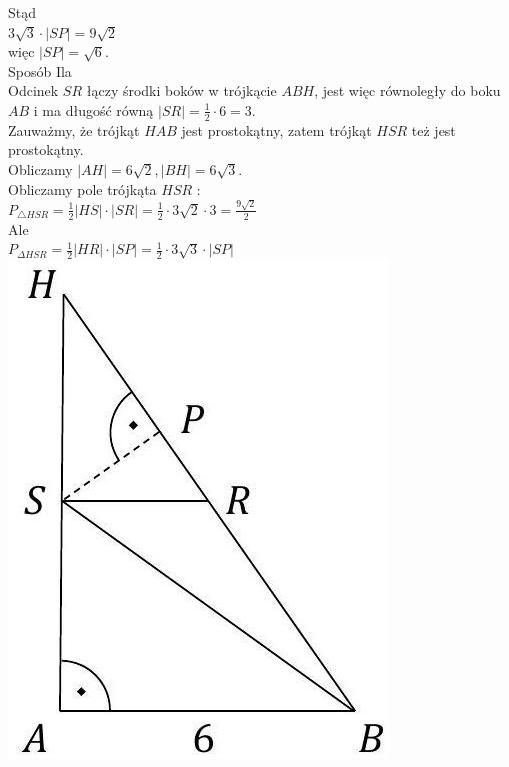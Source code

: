 \documentclass[10pt]{article}
\begin{document}
Stąd\\
$3 \sqrt{3} \cdot|S P|=9 \sqrt{2}$\\
więc $|S P|=\sqrt{6}$.\\
Sposób Ila\\
Odcinek $S R$ łączy środki boków w trójkącie $A B H$, jest więc równoległy do boku $A B$ i ma długość równą $|S R|=\frac{1}{2} \cdot 6=3$.\\
Zauważmy, że trójkąt $H A B$ jest prostokątny, zatem trójkąt $H S R$ też jest prostokątny.\\
Obliczamy $|A H|=6 \sqrt{2},|B H|=6 \sqrt{3}$.\\
Obliczamy pole trójkąta $H S R$ :\\
$P_{\triangle H S R}=\frac{1}{2}|H S| \cdot|S R|=\frac{1}{2} \cdot 3 \sqrt{2} \cdot 3=\frac{9 \sqrt{2}}{2}$\\
Ale\\
$P_{\Delta H S R}=\frac{1}{2}|H R| \cdot|S P|=\frac{1}{2} \cdot 3 \sqrt{3} \cdot|S P|$\\
\includegraphics[max width=\textwidth, center]{2025_02_07_dcb3d059df06a3930b0ag-34(1)}
\end{document}
